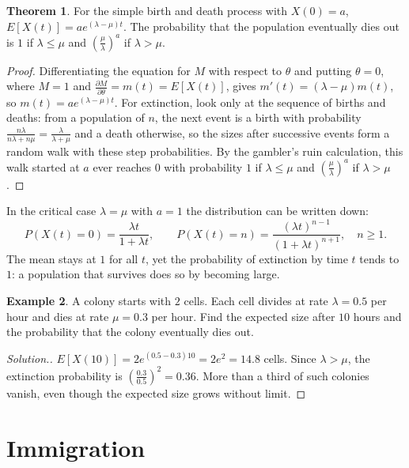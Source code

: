 \documentclass[12pt,a4paper]{report}
\theoremstyle{definition}
\newtheorem{thm}{Theorem}[section]
\newtheorem{exa}[thm]{Example}
\newenvironment{solution}
  {\renewcommand{\qedsymbol}{}\begin{proof}[\textit{Solution}.]}
  {\end{proof}}
\begin{document}
\begin{thm}
\label{thm:birthdeath}
For the simple birth and death process with $X(0) = a$, $E\left[X(t)\right] = ae^{(\lambda - \mu)t}$.
The probability that the population eventually dies out is $1$ if $\lambda\leq\mu$ and
$\left(\frac\mu\lambda\right)^a$ if $\lambda>\mu$.
\end{thm}

\begin{proof}
Differentiating the equation for $M$ with respect to $\theta$ and putting $\theta = 0$, where
$M = 1$ and $\frac{\partial M}{\partial\theta} = m(t) = E[X(t)]$, gives $m'(t) = (\lambda - \mu)m(t)$, so
$m(t) = ae^{(\lambda - \mu)t}$. For extinction, look only at the sequence of births and deaths: from
a population of $n$, the next event is a birth with probability $\frac{n\lambda}{n\lambda + n\mu} = \frac{\lambda}{\lambda + \mu}$
and a death otherwise, so the sizes after successive events form a random walk with these
step probabilities. By the gambler's ruin calculation, this walk started at $a$ ever reaches $0$
with probability $1$ if $\lambda\leq\mu$ and $\left(\frac{\mu}{\lambda}\right)^a$ if $\lambda>\mu$.
\end{proof}

In the critical case $\lambda = \mu$ with $a = 1$ the distribution can be written down:
\[P(X(t) = 0) = \frac{\lambda t}{1 + \lambda t},\qquad P(X(t) = n) = \frac{(\lambda t)^{n-1}}{(1 + \lambda t)^{n+1}},\quad n\geq 1 .\]
The mean stays at $1$ for all $t$, yet the probability of extinction by time $t$ tends to $1$: a
population that survives does so by becoming large.

\begin{exa}
\label{ex:birthdeath}
A colony starts with $2$ cells. Each cell divides at rate $\lambda = 0.5$ per hour and dies at rate
$\mu = 0.3$ per hour. Find the expected size after $10$ hours and the probability that the colony
eventually dies out.
\end{exa}

\begin{solution}
$E[X(10)] = 2e^{(0.5 - 0.3)10} = 2e^2 = 14.8$ cells. Since $\lambda>\mu$, the extinction probability
is $\left(\frac{0.3}{0.5}\right)^2 = 0.36$. More than a third of such colonies vanish, even though
the expected size grows without limit.
\end{solution}

\section{Immigration}
\end{document}
